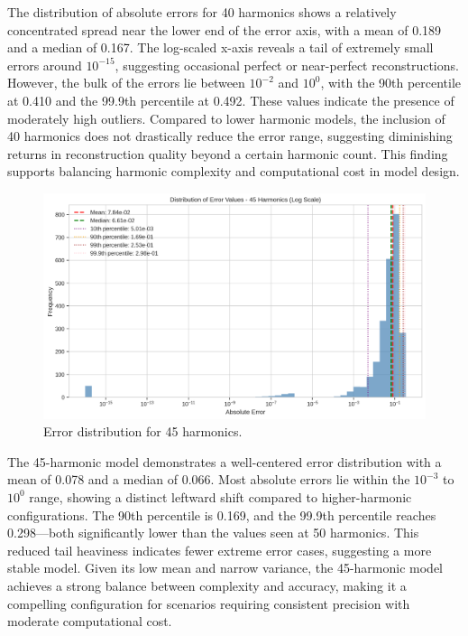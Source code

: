 \documentclass[preprint,12pt]{elsarticle}
\begin{document}
The distribution of absolute errors for 40 harmonics shows a relatively concentrated spread near the lower end of the error axis, with a mean of 0.189 and a median of 0.167. The log-scaled x-axis reveals a tail of extremely small errors around \(10^{-15}\), suggesting occasional perfect or near-perfect reconstructions. However, the bulk of the errors lie between \(10^{-2}\) and \(10^{0}\), with the 90th percentile at 0.410 and the 99.9th percentile at 0.492. These values indicate the presence of moderately high outliers. Compared to lower harmonic models, the inclusion of 40 harmonics does not drastically reduce the error range, suggesting diminishing returns in reconstruction quality beyond a certain harmonic count. This finding supports balancing harmonic complexity and computational cost in model design.

\begin{figure}[t]
    \centering
    \includegraphics[width=0.9\linewidth]{figures/error_distribution_45h.png}
    \caption{Error distribution for 45 harmonics.}
    \label{fig:error_45h}
\end{figure}

The 45-harmonic model demonstrates a well-centered error distribution with a mean of 0.078 and a median of 0.066. Most absolute errors lie within the \(10^{-3}\) to \(10^{0}\) range, showing a distinct leftward shift compared to higher-harmonic configurations. The 90th percentile is 0.169, and the 99.9th percentile reaches 0.298—both significantly lower than the values seen at 50 harmonics. This reduced tail heaviness indicates fewer extreme error cases, suggesting a more stable model. Given its low mean and narrow variance, the 45-harmonic model achieves a strong balance between complexity and accuracy, making it a compelling configuration for scenarios requiring consistent precision with moderate computational cost.
\end{document}
